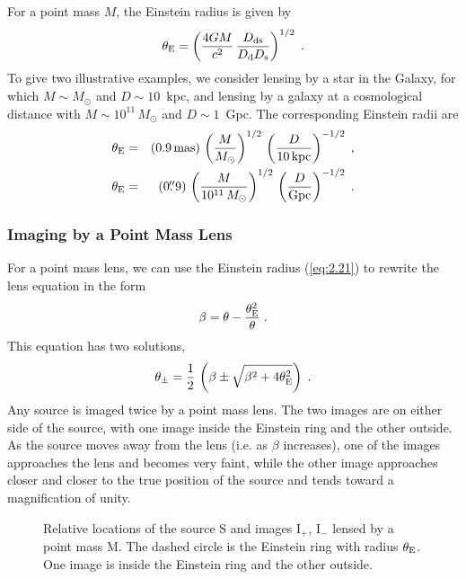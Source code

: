 \documentclass[a4paper,10pt]{article} %
\newcommand{\farcs}{\hbox{$.\!\!^{\prime\prime}$}}
\begin{document}
For a point mass $M$, the Einstein radius is given by
\begin{equation}
  \theta_{\rm E} = \left(\frac{4GM}{c^2}\,
  \frac{D_{\rm ds}}{D_{\rm d}D_{\rm s}}\right)^{1/2}\;.
\label{eq:2.22}
\end{equation}
To give two illustrative examples, we consider lensing by a star in
the Galaxy, for which $M\sim M_\odot$ and $D\sim10$~kpc, and lensing
by a galaxy at a cosmological distance with $M\sim10^{11}\,M_\odot$
and $D\sim1$~Gpc. The corresponding Einstein radii are
\begin{eqnarray}
  \theta_{\rm E} &=&
  (0.9\,{\rm mas})\,\left(\frac{M}{M_\odot}\right)^{1/2}\,
  \left(\frac{D}{10\,{\rm kpc}}\right)^{-1/2}\;,\nonumber\\
  \theta_{\rm E} &=&
  (0\farcs9)\,\left(\frac{M}{10^{11}\,M_\odot}\right)^{1/2}\,
  \left(\frac{D}{{\rm Gpc}}\right)^{-1/2}\;.\nonumber\\
\label{eq:2.23}
\end{eqnarray}

\subsubsection{Imaging by a Point Mass Lens}
\label{NB:subsubsect2.1.5}

For a point mass lens, we can use the Einstein radius (\ref{eq:2.21})
to rewrite the lens equation in the form
\begin{equation}
  \beta = \theta - \frac{\theta_{\rm E}^2}{\theta}\;.
\label{eq:2.24}
\end{equation}
This equation has two solutions,
\begin{equation}
  \theta_\pm = \frac{1}{2}\,\left(
  \beta\pm\sqrt{\beta^2+4\theta_{\rm E}^2}\right)\;.
\label{eq:2.25}
\end{equation}
Any source is imaged twice by a point mass lens. The two images are on
either side of the source, with one image inside the Einstein ring and
the other outside. As the source moves away from the lens (i.e. as
$\beta$ increases), one of the images approaches the lens and becomes
very faint, while the other image approaches closer and closer to the
true position of the source and tends toward a magnification of unity.

\begin{figure}[ht] %
\begin{center}
\begin{minipage}[t]{0.6\hsize}
\end{minipage}
\end{center}
\caption{Relative locations of the source S and images I$_+$, I$_-$
  lensed by a point mass M. The dashed circle is the Einstein ring
  with radius $\theta_{\rm E}$. One image is inside the Einstein ring
  and the other outside.}
\label{NB:fig2.6}
\end{figure}
\end{document}
